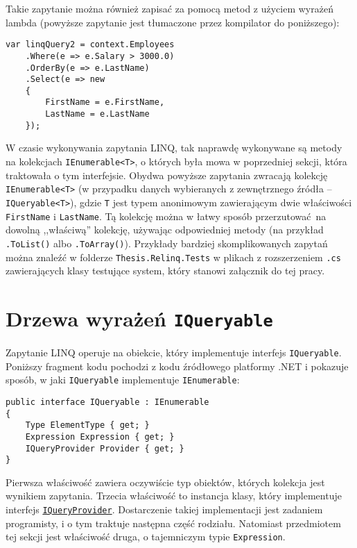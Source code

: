 Takie zapytanie można również zapisać za pomocą metod z użyciem wyrażeń lambda (powyższe zapytanie jest tłumaczone przez kompilator do poniższego): \pagebreak

\begin{lstlisting}
var linqQuery2 = context.Employees
    .Where(e => e.Salary > 3000.0)
    .OrderBy(e => e.LastName)
    .Select(e => new
    { 
        FirstName = e.FirstName,
        LastName = e.LastName
    });
\end{lstlisting}

W czasie wykonywania zapytania LINQ, tak naprawdę wykonywane są metody na kolekcjach \texttt{IEnumerable<T>}, o których była mowa w poprzedniej sekcji, która traktowała o tym interfejsie. Obydwa powyższe zapytania zwracają kolekcję \texttt{IEnumerable<T>} (w przypadku danych wybieranych z zewnętrznego źródła – \texttt{IQueryable<T>}), gdzie \texttt{T} jest typem anonimowym zawierającym dwie właściwości \texttt{FirstName} i \texttt{LastName}. Tą kolekcję można w łatwy sposób przerzutować na dowolną ,,właściwą'' kolekcję, używając odpowiedniej metody (na przykład \texttt{.ToList()} albo \texttt{.ToArray()}). Przykłady bardziej skomplikowanych zapytań można znaleźć w folderze \texttt{Thesis.Relinq.Tests} w plikach z rozszerzeniem \texttt{.cs} zawierających klasy testujące system, który stanowi załącznik do tej pracy.

\section{Drzewa wyrażeń \texttt{IQueryable}}
Zapytanie LINQ operuje na obiekcie, który implementuje interfejs \texttt{IQueryable}. Poniższy fragment kodu pochodzi z kodu źródłowego platformy .NET i pokazuje sposób, w jaki \texttt{IQueryable} implementuje \texttt{IEnumerable}:

\begin{lstlisting}
public interface IQueryable : IEnumerable
{
    Type ElementType { get; }
    Expression Expression { get; }
    IQueryProvider Provider { get; }
}
\end{lstlisting}

Pierwsza właściwość zawiera oczywiście typ obiektów, których kolekcja jest wynikiem zapytania. Trzecia właściwość to instancja klasy, który implementuje interfejs \href{https://msdn.microsoft.com/pl-pl/library/system.linq.iqueryprovider(v=vs.110).aspx}{\texttt{IQueryProvider}}. Dostarczenie takiej implementacji jest zadaniem programisty, i o tym traktuje następna część rodziału. Natomiast przedmiotem tej sekcji jest właściwość druga, o tajemniczym typie \texttt{Expression}.

